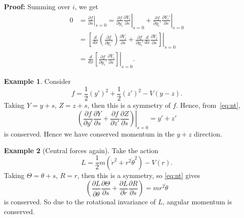 \documentclass[12pt]{article}
\theoremstyle{definition}
\newtheorem{example}{Example}[section]
\theoremstyle{remark}
\begin{document}
\begin{adjustbox}{minipage = \columnwidth - 25.5pt, margin=1em, frame=1pt, margin=0em}
\textbf{Proof:} Summing over $i$, we get
\begin{align*}
	0 &= \left.\frac{\partial f}{\partial s}\right|_{s = 0} = \left. \frac{\partial f}{\partial y_i} \frac{\partial Y_i}{\partial s} \right|_{s = 0} + \left.\frac{\partial f}{\partial y_i'} \frac{\partial Y_i'}{\partial s}\right|_{s = 0}\\
	  &= \left.\left[ \frac{d}{dx} \left( \frac{\partial f}{\partial y_i'}\right) \frac{\partial Y_i}{\partial s} + \frac{\partial f}{\partial y_i'} \frac{d}{dx} \frac{\partial Y_i}{\partial s} \right] \right|_{s = 0} \\
	  &= \left. \frac{d}{dx} \left[ \frac{\partial f}{\partial y_i'} \frac{\partial Y_i}{\partial s} \right] \right|_{s = 0}\!\!\!\!\!\!\!\!.
\end{align*}

\end{adjustbox}

\begin{adjustbox}{minipage = \columnwidth - 25.5pt, margin=1em, frame=1pt, margin=0em}
\begin{example}
	Consider
	\[
		f = \frac{1}{2}(y')^2 + \frac{1}{2}(z')^2 - V(y - z)
	.\]
	Taking $Y = y + s$, $Z = z + s$, then this is a symmetry of $f$. Hence, from~\eqref{eq:nt},
	\[
		\left.\left(\frac{\partial f}{\partial y'} \frac{\partial Y}{\partial s} + \frac{\partial f}{\partial z'} \frac{\partial Z}{\partial s} \right)\right|_{s = 0} = y' + z'
	\]
	is conserved. Hence we have conserved momentum in the $y + z$ direction.
\end{example}

\end{adjustbox}

\begin{adjustbox}{minipage = \columnwidth - 25.5pt, margin=1em, frame=1pt, margin=0em}
	\begin{example}[Central forces again]
	Take the action
	\[
		L = \frac{1}{2} m(\dot r^2 + r^2 \dot \theta^2) - V(r)
	.\]
	Taking $\Theta = \theta + s$, $R = r$, then this is a symmetry, so \eqref{eq:nt} gives
	\[
		\left( \frac{\partial L}{\partial \dot \theta} \frac{\partial \Theta}{\partial s} + \frac{\partial L}{\partial \dot r} \frac{\partial R}{\partial s} \right) = mr^2\dot \theta
	\]
	is conserved. So due to the rotational invariance of $L$, angular momentum is conserved.
\end{example}

\end{adjustbox}
\end{document}
